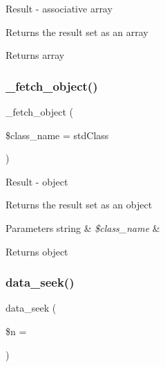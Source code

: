 Result -\/ associative array

Returns the result set as an array

\begin{DoxyReturn}{Returns}
array 
\end{DoxyReturn}
\mbox{\label{class_c_i___d_b__mysql__result_a60806be6a9c2488820813c2a7f4fef71}} 
\subsubsection{\texorpdfstring{\+\_\+fetch\+\_\+object()}{\_fetch\_object()}}
{\footnotesize\ttfamily \+\_\+fetch\+\_\+object (\begin{DoxyParamCaption}\item[{}]{\$class\+\_\+name = {\ttfamily \textquotesingle{}stdClass\textquotesingle{}} }\end{DoxyParamCaption})\hspace{0.3cm}{\ttfamily [protected]}}

Result -\/ object

Returns the result set as an object


\begin{DoxyParams}[1]{Parameters}
string & {\em \$class\+\_\+name} & \\
\hline
\end{DoxyParams}
\begin{DoxyReturn}{Returns}
object 
\end{DoxyReturn}
\mbox{\label{class_c_i___d_b__mysql__result_a8255ae91816e4206e29eb7581c5af0f1}} 
\subsubsection{\texorpdfstring{data\+\_\+seek()}{data\_seek()}}
{\footnotesize\ttfamily data\+\_\+seek (\begin{DoxyParamCaption}\item[{}]{\$n = {} }\end{DoxyParamCaption})}

